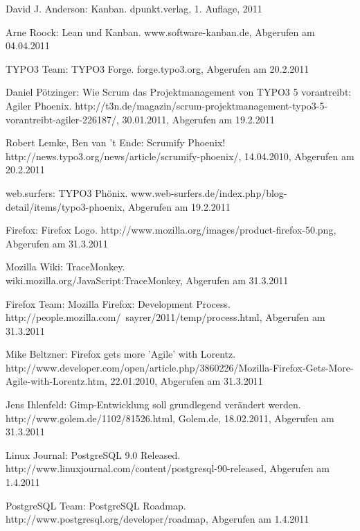 \documentclass[german,english]{header}
\begin{document}
\begin{thebibliography}{5}
David J. Anderson: 
Kanban.
dpunkt.verlag, 1. Auflage, 2011

Arne Roock: 
Lean und Kanban.
www.software-kanban.de, Abgerufen am 04.04.2011

TYPO3 Team:
TYPO3 Forge.
forge.typo3.org, Abgerufen am 20.2.2011

Daniel Pötzinger:
Wie Scrum das Projektmanagement von TYPO3 5 vorantreibt: Agiler Phoenix.
http://t3n.de/magazin/scrum-projektmanagement-typo3-5-vorantreibt-agiler-226187/, 30.01.2011, Abgerufen am 19.2.2011

Robert Lemke, Ben van 't Ende:
Scrumify Phoenix!\\
http://news.typo3.org/news/article/scrumify-phoenix/, 14.04.2010, Abgerufen am 20.2.2011

web.surfers:
TYPO3 Phönix.
www.web-surfers.de/index.php/blog-detail/items/typo3-phoenix, Abgerufen am 19.2.2011

Firefox:
Firefox Logo.
http://www.mozilla.org/images/product-firefox-50.png, Abgerufen am 31.3.2011

Mozilla Wiki:
TraceMonkey.\\
wiki.mozilla.org/JavaScript:TraceMonkey, Abgerufen am 31.3.2011

Firefox Team:
Mozilla Firefox: Development Process.\\
http://people.mozilla.com/~sayrer/2011/temp/process.html, Abgerufen am 31.3.2011

Mike Beltzner:
Firefox gets more 'Agile' with Lorentz.\\
http://www.developer.com/open/article.php/3860226/Mozilla-Firefox-Gets-More-Agile-with-Lorentz.htm, 22.01.2010, Abgerufen am 31.3.2011

Jens Ihlenfeld: Gimp-Entwicklung soll grundlegend verändert werden.\\
http://www.golem.de/1102/81526.html, Golem.de, 18.02.2011, Abgerufen am 31.3.2011

Linux Journal:
PostgreSQL 9.0 Released.\\
http://www.linuxjournal.com/content/postgresql-90-released, Abgerufen am 1.4.2011

PostgreSQL Team:
PostgreSQL Roadmap.\\
http://www.postgresql.org/developer/roadmap, Abgerufen am 1.4.2011


\end{thebibliography}
\end{document}
